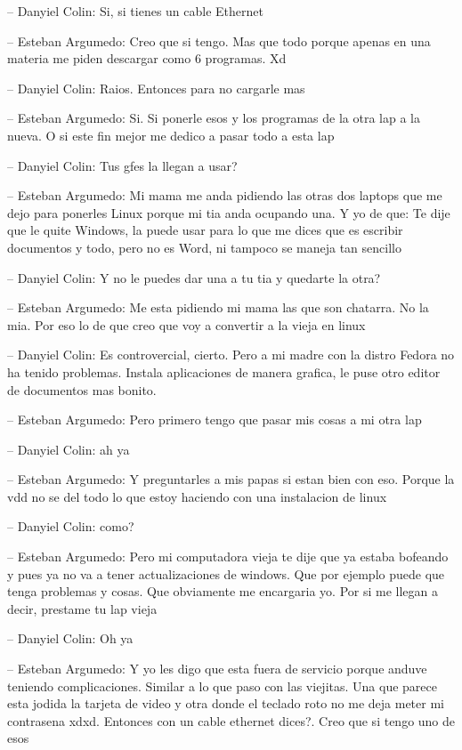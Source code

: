 -- Danyiel Colin: Si, si tienes un cable Ethernet

-- Esteban Argumedo: Creo que si tengo. Mas que todo porque apenas en
una materia me piden descargar como 6 programas. Xd

-- Danyiel Colin: Raios. Entonces para no cargarle mas

-- Esteban Argumedo: Si. Si ponerle esos y los programas de la otra lap
a la nueva. O si este fin mejor me dedico a pasar todo a esta lap

-- Danyiel Colin: Tus gfes la llegan a usar?

-- Esteban Argumedo: Mi mama me anda pidiendo las otras dos laptops que
me dejo para ponerles Linux porque mi tia anda ocupando una. Y yo de
que: Te dije que le quite Windows, la puede usar para lo que me dices
que es escribir documentos y todo, pero no es Word, ni tampoco se maneja
tan sencillo

-- Danyiel Colin: Y no le puedes dar una a tu tia y quedarte la otra?

-- Esteban Argumedo: Me esta pidiendo mi mama las que son chatarra. No
la mia. Por eso lo de que creo que voy a convertir a la vieja en linux

-- Danyiel Colin: Es controvercial, cierto. Pero a mi madre con la
distro Fedora no ha tenido problemas. Instala aplicaciones de manera
grafica, le puse otro editor de documentos mas bonito.

-- Esteban Argumedo: Pero primero tengo que pasar mis cosas a mi otra
lap

-- Danyiel Colin: ah ya

-- Esteban Argumedo: Y preguntarles a mis papas si estan bien con eso.
Porque la vdd no se del todo lo que estoy haciendo con una instalacion
de linux

-- Danyiel Colin: como?

-- Esteban Argumedo: Pero mi computadora vieja te dije que ya estaba
bofeando y pues ya no va a tener actualizaciones de windows. Que por
ejemplo puede que tenga problemas y cosas. Que obviamente me encargaria
yo. Por si me llegan a decir, prestame tu lap vieja

-- Danyiel Colin: Oh ya

-- Esteban Argumedo: Y yo les digo que esta fuera de servicio porque
anduve teniendo complicaciones. Similar a lo que paso con las viejitas.
Una que parece esta jodida la tarjeta de video y otra donde el teclado
roto no me deja meter mi contrasena xdxd. Entonces con un cable ethernet
dices?. Creo que si tengo uno de esos

